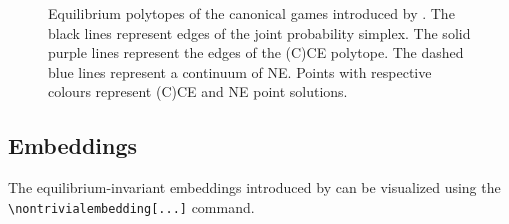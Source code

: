 \documentclass[10pt]{article}
\begin{document}
\begin{figure}[t]
    \caption{Equilibrium polytopes of the canonical games introduced by \cite{marris2023_equilibrium_invariant_embedding_2x2_arxiv}. The black lines represent edges of the joint probability simplex. The solid purple lines represent the edges of the (C)CE polytope. The dashed blue lines represent a continuum of NE. Points with respective colours represent (C)CE and NE point solutions.}
    \label{fig:polytopes}
\end{figure}


\subsection{Embeddings}

The equilibrium-invariant embeddings introduced by \cite{marris2023_equilibrium_invariant_embedding_2x2_arxiv} can be visualized using the \verb!\nontrivialembedding[...]! command.
\end{document}
